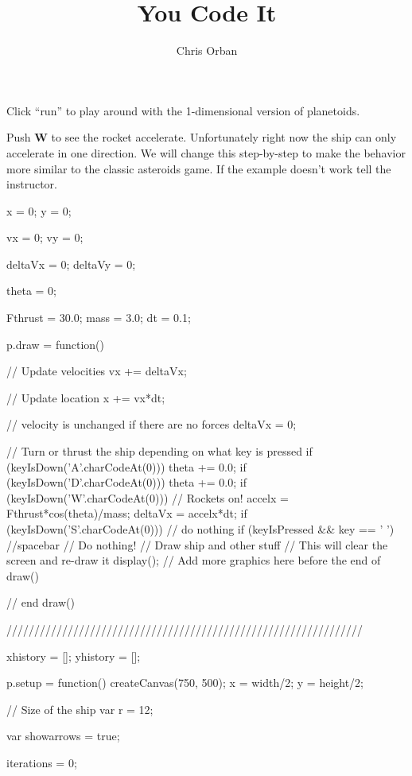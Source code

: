 \documentclass{ximera}
\author{Chris Orban}
\title{You Code It}
\begin{document}
\begin{abstract}
\end{abstract}
\maketitle

Click ``run'' to play around with the 1-dimensional version of planetoids.

Push \textbf{W} to see the rocket accelerate. Unfortunately right now
the ship can only accelerate in one direction. We will change this
step-by-step to make the behavior more similar to the classic
asteroids game. If the example doesn't work tell the instructor.

\begin{javascriptCode}
x = 0;
y = 0;

vx = 0;
vy = 0;

deltaVx = 0;
deltaVy = 0;

theta = 0;

Fthrust = 30.0;
mass = 3.0;
dt = 0.1;

p.draw = function() {
    // Update velocities
    vx += deltaVx;

    // Update location
    x += vx*dt;

    // velocity is unchanged if there are no forces
    deltaVx = 0;

    // Turn or thrust the ship depending on what key is pressed
    if (keyIsDown('A'.charCodeAt(0))) {
        theta += 0.0;
    }
    if (keyIsDown('D'.charCodeAt(0))) {
        theta += 0.0;
    }
    if (keyIsDown('W'.charCodeAt(0))) {
        // Rockets on!
        accelx = Fthrust*cos(theta)/mass;
        deltaVx = accelx*dt;
    }
    if (keyIsDown('S'.charCodeAt(0))) {
            // do nothing
    }
    if (keyIsPressed && key == ' '){ //spacebar
        // Do nothing!
    }
    // Draw ship and other stuff
    // This will clear the screen and re-draw it
    display();
    // Add more graphics here before the end of draw()
  
} // end draw()

////////////////////////////////////////////////////////////////

xhistory = [];
yhistory = [];

p.setup = function() {
    createCanvas(750, 500);
    x = width/2;
    y = height/2;
}

// Size of the ship
var r = 12;

var showarrows = true;

iterations = 0;


\end{javascriptCode}
\end{document}
